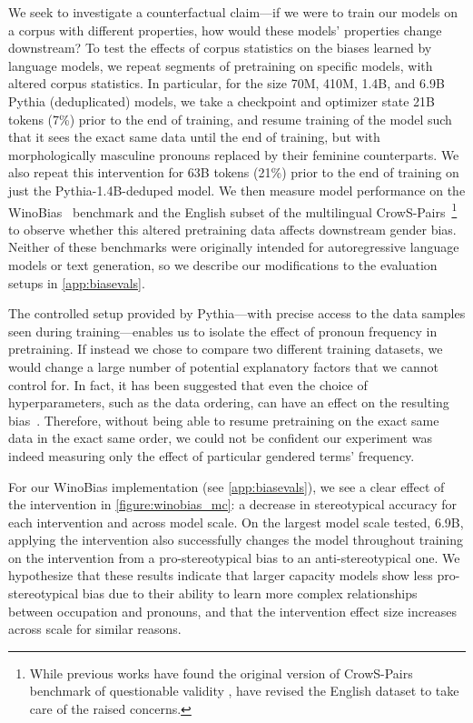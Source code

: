 We seek to investigate a counterfactual claim---if we were to train our models on a corpus with different properties, how would these models' properties change downstream? To test the effects of corpus statistics on the biases learned by language models, we repeat segments of pretraining on specific models, with altered corpus statistics. In particular, for the size 70M, 410M, 1.4B, and 6.9B Pythia (deduplicated) models, we take a checkpoint and optimizer state 21B tokens (7\%) prior to the end of training, and resume training of the model such that it sees the exact same data until the end of training, but with morphologically masculine pronouns replaced by their feminine counterparts. We also repeat this intervention for 63B tokens (21\%) prior to the end of training on just the Pythia-1.4B-deduped model. We then measure model performance on the WinoBias~\citep{zhao2018gender} benchmark and the English subset of the multilingual CrowS-Pairs~\citep{neveol-etal-2022-french}\footnote{While previous works have found the original version of CrowS-Pairs~\citep{nangia-etal-2020-crows} benchmark of questionable validity \citep{blodgett-etal-2021-stereotyping}, \citet{neveol-etal-2022-french} have revised the English dataset to take care of the raised concerns.} to observe whether this altered pretraining data affects downstream gender bias. Neither of these benchmarks were originally intended for autoregressive language models or text generation, so we describe our modifications to the evaluation setups in \ref{app:biasevals}.

The controlled setup provided by Pythia---with precise access to the data samples seen during training---enables us to isolate the effect of pronoun frequency in pretraining. If instead we chose to compare two different training datasets, we would change a large number of potential explanatory factors that we cannot control for. In fact, it has been suggested that even the choice of hyperparameters, such as the data ordering, can have an effect on the resulting bias~\citep{d2020underspecification}. Therefore, without being able to resume pretraining on the exact same data in the exact same order, we could not be confident our experiment was indeed measuring only the effect of particular gendered terms' frequency.

For our WinoBias implementation (see \ref{app:biasevals}), we see a clear effect of the intervention in \ref{figure:winobias_mc}: a decrease in stereotypical accuracy for each intervention and across model scale. On the largest model scale tested, 6.9B, applying the intervention also successfully changes the model throughout training on the intervention from a pro-stereotypical bias to an anti-stereotypical one. We hypothesize that these results indicate that larger capacity models show less pro-stereotypical bias due to their ability to learn more complex relationships between occupation and pronouns, and that the intervention effect size increases across scale for similar reasons.

